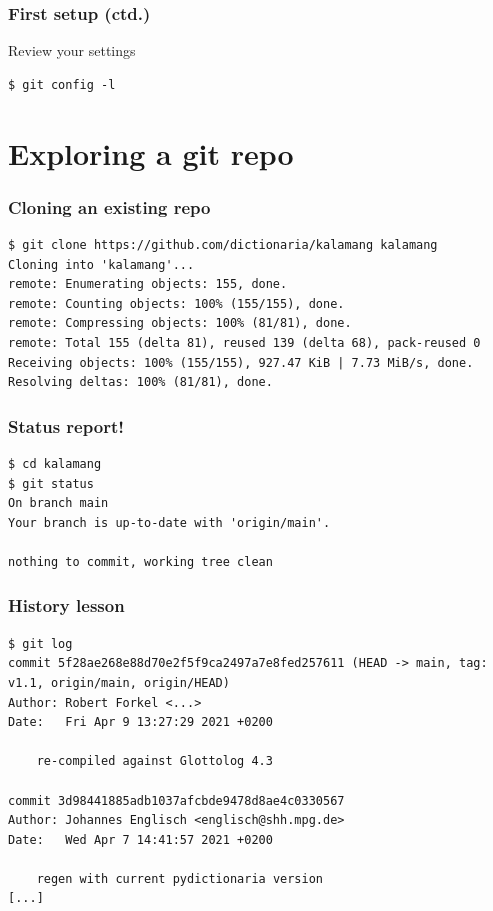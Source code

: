 \documentclass[12pt]{beamer}
\begin{document}
\begin{frame}[fragile]
  \frametitle{First setup (ctd.)}

  \begin{block}{Review your settings}
    {\footnotesize{}%
      \begin{verbatim}
$ git config -l
      \end{verbatim}%
    }
  \end{block}
\end{frame}

\section{Exploring a git repo}

\begin{frame}[fragile]
  \frametitle{Cloning an existing repo}

  {\footnotesize{}%
    \begin{verbatim}
$ git clone https://github.com/dictionaria/kalamang kalamang
Cloning into 'kalamang'...
remote: Enumerating objects: 155, done.
remote: Counting objects: 100% (155/155), done.
remote: Compressing objects: 100% (81/81), done.
remote: Total 155 (delta 81), reused 139 (delta 68), pack-reused 0
Receiving objects: 100% (155/155), 927.47 KiB | 7.73 MiB/s, done.
Resolving deltas: 100% (81/81), done.
    \end{verbatim}%
  }
\end{frame}

\begin{frame}[fragile]
  \frametitle{Status report!}

  {\footnotesize{}%
    \begin{verbatim}
$ cd kalamang
$ git status
On branch main
Your branch is up-to-date with 'origin/main'.

nothing to commit, working tree clean
    \end{verbatim}%
  }
\end{frame}

\begin{frame}[fragile]
  \frametitle{History lesson}

  {\footnotesize{}%
    \begin{verbatim}
$ git log
commit 5f28ae268e88d70e2f5f9ca2497a7e8fed257611 (HEAD -> main, tag: v1.1, origin/main, origin/HEAD)
Author: Robert Forkel <...>
Date:   Fri Apr 9 13:27:29 2021 +0200

    re-compiled against Glottolog 4.3

commit 3d98441885adb1037afcbde9478d8ae4c0330567
Author: Johannes Englisch <englisch@shh.mpg.de>
Date:   Wed Apr 7 14:41:57 2021 +0200

    regen with current pydictionaria version
[...]
    \end{verbatim}%
  }
\end{frame}
\end{document}
